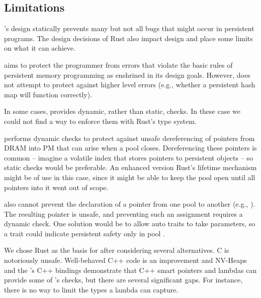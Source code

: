 \subsection{Limitations}
\label{sec:discuss}

\This{}'s design statically prevents many but not all bugs that might occur in
persistent programs.  The design decisions of Rust also impact \this{} design
and place some limits on what it can achieve.

 \This{} aims to protect the programmer from
errors that violate the basic rules of persistent memory programming as
enshrined in its design goals.  However, \this{} does not attempt to protect
against higher level errors (e.g., whether a persistent hash map will function
correctly).

 In some cases, \this{} provides dynamic, rather than static, checks.
In these case we could not find a way to enforce them with Rust's
type system.

\This{} performs dynamic checks to protect
against unsafe dereferencing of  pointers from DRAM into PM that can arise when a pool
closes.  Dereferencing these pointers is common -- imagine a volatile index
that stores pointers to persistent objects -- so static checks would be
preferable.  An enhanced version Rust's lifetime mechanism might be of use in
this case, since it might be able to keep the pool open until all pointers into
it went out of scope.

\This{} also cannot prevent the declaration of a pointer from one pool to another (e.g.,
).  The resulting pointer is unsafe, and preventing
such an assignment requires a dynamic check.  One solution would be to allow
auto traits to take parameters, so a trait
 could indicate persistent safety only in pool .


 We chose Rust as the basis for \this{} after
considering several alternatives.  C is notoriously unsafe.  Well-behaved C++ code
is an improvement and NV-Heaps and the 's C++ bindings demonstrate that C++
smart pointers and lambdas can provide some of \this{}'s checks, but there are
several significant gaps.  For instance, there is no way to limit the types a
lambda can capture.

